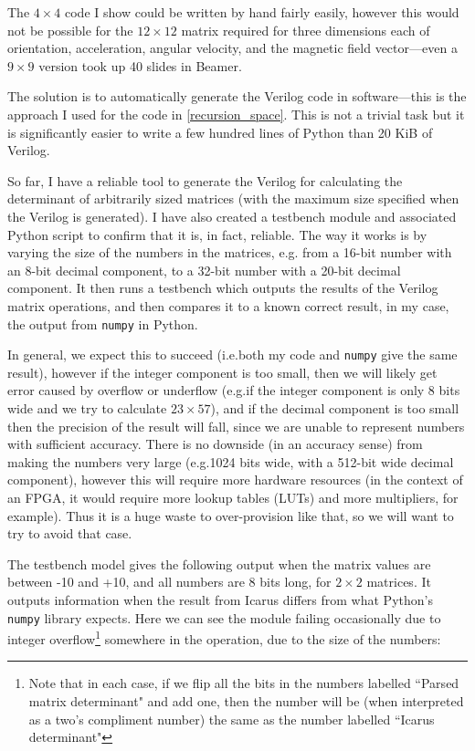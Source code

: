 \documentclass[12pt]{article}
\begin{document}
The $4\times4$ code I show could be written by hand fairly easily, however this would not be possible for the $12\times12$ matrix required for three dimensions each of orientation, acceleration, angular velocity, and the magnetic field vector---even a $9\times9$ version took up 40 slides in Beamer.

The solution is to automatically generate the Verilog code in software---this is the approach I used for the code in \ref{recursion_space}. This is not a trivial task but it is significantly easier to write a few hundred lines of Python than 20 KiB of Verilog.

So far, I have a reliable tool to generate the Verilog for calculating the determinant of arbitrarily sized matrices (with the maximum size specified when the Verilog is generated). I have also created a testbench module and associated Python script to confirm that it is, in fact, reliable. The way it works is by varying the size of the numbers in the matrices, e.g. from a 16-bit number with an 8-bit decimal component, to a 32-bit number with a 20-bit decimal component. It then runs a testbench which outputs the results of the Verilog matrix operations, and then compares it to a known correct result, in my case, the output from \lstinline|numpy| in Python.

In general, we expect this to succeed (i.e.\@ both my code and \lstinline|numpy| give the same result), however if the integer component is too small, then we will likely get error caused by overflow or underflow (e.g.\@ if the integer component is only 8 bits wide and we try to calculate $23 \times 57$), and if the decimal component is too small then the precision of the result will fall, since we are unable to represent numbers with sufficient accuracy. There is no downside (in an accuracy sense) from making the numbers very large (e.g.\@ 1024 bits wide, with a 512-bit wide decimal component), however this will require more hardware resources (in the context of an FPGA, it would require more lookup tables (LUTs) and more multipliers, for example). Thus it is a huge waste to over-provision like that, so we will want to try to avoid that case.

The testbench model gives the following output when the matrix values are between -10 and +10, and all numbers are 8 bits long, for $2\times2$ matrices. It outputs information when the result from Icarus differs from what Python's \lstinline|numpy| library expects. Here we can see the module failing occasionally due to integer overflow\footnote{Note that in each case, if we flip all the bits in the numbers labelled ``Parsed matrix determinant" and add one, then the number will be (when interpreted as a two's compliment number) the same as the number labelled ``Icarus determinant"} somewhere in the operation, due to the size of the numbers:
\end{document}
